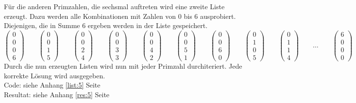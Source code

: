 \documentclass[a4paper, 10pt, fleqn]{article}
\begin{document}
Für die anderen Primzahlen, die sechsmal auftreten wird eine zweite Liste 
erzeugt. Dazu werden alle Kombinationen mit Zahlen von 0 bis 6 ausprobiert. 
Diejenigen, die in Summe $6$ ergeben werden in der Liste gespeichert. 
\[ \begin{pmatrix}0\\0\\0\\6\end{pmatrix} \qquad 
   \begin{pmatrix}0\\0\\1\\5\end{pmatrix} \qquad 
   \begin{pmatrix}0\\0\\2\\4\end{pmatrix} \qquad 
   \begin{pmatrix}0\\0\\3\\3\end{pmatrix} \qquad 
   \begin{pmatrix}0\\0\\4\\2\end{pmatrix} \qquad 
   \begin{pmatrix}0\\0\\5\\1\end{pmatrix} \qquad 
   \begin{pmatrix}0\\0\\6\\0\end{pmatrix} \qquad 
   \begin{pmatrix}0\\1\\0\\5\end{pmatrix} \qquad 
   \begin{pmatrix}0\\1\\1\\4\end{pmatrix} \qquad 
   \dots \qquad
   \begin{pmatrix}6\\0\\0\\0\end{pmatrix} \qquad \]
Durch die nun erzeugten Listen wird nun mit jeder Primzahl durchiteriert. Jede 
korrekte Lösung wird ausgegeben. \\
Code: siehe Anhang \ref{list:5} Seite \pageref{list:5} \\
Resultat: siehe Anhang \ref{res:5} Seite \pageref{res:5} 
% 
\end{document}
